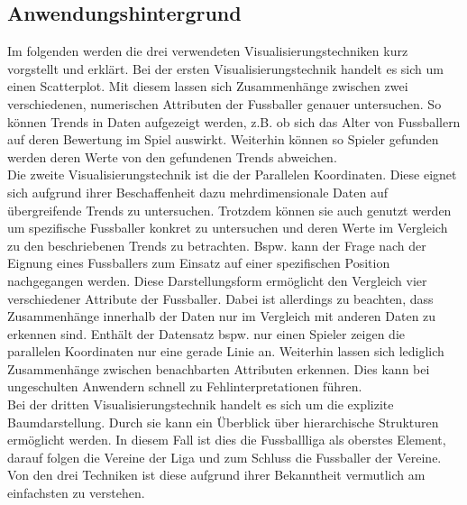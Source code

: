 \documentclass[usegeometry=true]{scrartcl}
\begin{document}
\newpage


\subsection{Anwendungshintergrund}

Im folgenden werden die drei verwendeten Visualisierungstechniken kurz vorgstellt und erklärt.
Bei der ersten Visualisierungstechnik handelt es sich um einen Scatterplot.\cite{noauthor_complete_nodate} Mit diesem lassen sich Zusammenhänge zwischen zwei verschiedenen, numerischen Attributen der Fussballer genauer untersuchen. So können Trends in Daten aufgezeigt werden, z.B. ob sich das Alter von Fussballern auf deren Bewertung im Spiel auswirkt.
Weiterhin können so Spieler gefunden werden deren Werte von den gefundenen Trends abweichen.\\
Die zweite Visualisierungstechnik ist die der Parallelen Koordinaten.\cite{few_multivariate_nodate} Diese eignet sich aufgrund ihrer Beschaffenheit dazu mehrdimensionale Daten auf übergreifende Trends zu untersuchen. Trotzdem können sie auch genutzt werden um spezifische Fussballer konkret zu untersuchen und deren Werte im Vergleich zu den beschriebenen Trends zu betrachten. Bspw. kann der Frage nach der Eignung eines Fussballers zum Einsatz auf einer spezifischen Position nachgegangen werden.
Diese Darstellungsform ermöglicht den Vergleich vier verschiedener Attribute der Fussballer. Dabei ist allerdings zu beachten, dass Zusammenhänge innerhalb der Daten nur im Vergleich mit anderen Daten zu erkennen sind. Enthält der Datensatz bspw. nur einen Spieler zeigen die parallelen Koordinaten nur eine gerade Linie an. Weiterhin lassen sich lediglich Zusammenhänge zwischen benachbarten Attributen erkennen. Dies kann bei ungeschulten Anwendern schnell zu Fehlinterpretationen führen.\\
Bei der dritten Visualisierungstechnik handelt es sich um die explizite Baumdarstellung. Durch sie kann ein Überblick über hierarchische Strukturen ermöglicht werden. In diesem Fall ist dies die Fussballliga als oberstes Element, darauf folgen die Vereine der Liga und zum Schluss die Fussballer der Vereine. Von den drei Techniken ist diese aufgrund ihrer Bekanntheit vermutlich am einfachsten zu verstehen.
\end{document}
